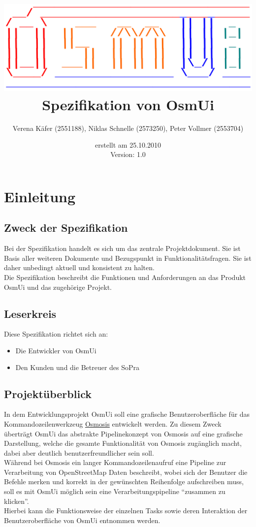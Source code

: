 \documentclass[a4paper,10pt]{scrartcl}
\author{Verena Käfer (2551188), Niklas Schnelle (2573250), Peter Vollmer (2553704)}
\date{erstellt am 25.10.2010\\
Version: 1.0}
\title{\includegraphics[width=15cm]{../projektplan/Logo_Osmui.png} \\ 
Spezifikation von OsmUi}
\begin{document}
\maketitle
\newpage
\tableofcontents
\newpage

\section{Einleitung}
\subsection{Zweck der Spezifikation}
Bei der Spezifikation handelt es sich um das zentrale Projektdokument. Sie ist Basis aller weiteren Dokumente und
Bezugspunkt in Funktionalitätsfragen. Sie ist daher unbedingt aktuell und konsistent zu halten.\\
Die Spezifikation beschreibt die Funktionen und Anforderungen an das Produkt OsmUi und das zugehörige Projekt.
\subsection{Leserkreis}
Diese Spezifikation richtet sich an:
\begin{itemize}
 \item Die Entwickler von OsmUi
 \item Den Kunden und die Betreuer des SoPra
\end{itemize}

\subsection{Projektüberblick}
In dem Entwicklungsprojekt OsmUi soll eine grafische Benutzeroberfläche für das Kommandozeilenwerkzeug \href{http://wiki.openstreetmap.org/wiki/Osmosis}{Osmosis}
entwickelt werden. Zu diesem Zweck überträgt OsmUi das abstrakte Pipelinekonzept von Osmosis auf eine grafische Darstellung, welche die gesamte
Funktionalität von Osmosis zugänglich macht, dabei aber deutlich benutzerfreundlicher sein soll.\\
Während bei Osmosis ein langer Kommandozeilenaufruf eine Pipeline zur Verarbeitung von OpenStreetMap Daten beschreibt, wobei sich der Benutzer die Befehle merken
und korrekt in der gewünschten Reihenfolge aufschreiben muss, soll es mit OsmUi möglich sein eine Verarbeitungspipeline ``zusammen zu klicken''.\\
Hierbei kann die Funktionsweise der einzelnen Tasks sowie deren Interaktion der Benutzeroberfläche von OsmUi entnommen werden.
\end{document}
